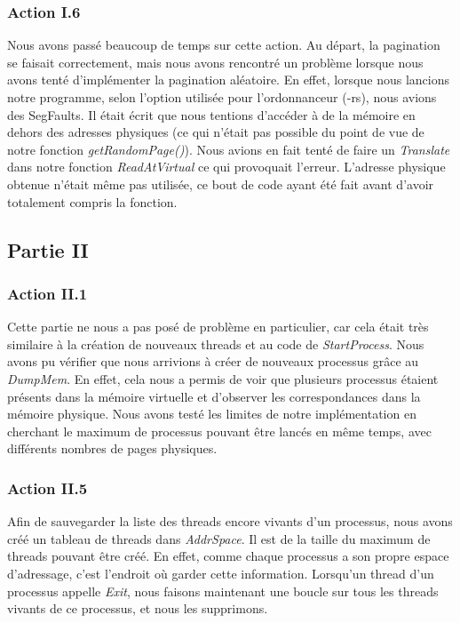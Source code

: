 \documentclass{article}
\begin{document}
\subsubsection{Action I.6}
Nous avons passé beaucoup de temps sur cette action. Au départ, la pagination se faisait 
correctement, mais nous avons rencontré un problème
 lorsque nous avons tenté d'implémenter la pagination aléatoire. En effet, lorsque nous lancions
 notre programme, selon l'option utilisée pour l'ordonnanceur (-rs), nous avions des SegFaults.
 Il était écrit que nous tentions d'accéder à de la mémoire en dehors des adresses physiques (ce qui
 n'était pas possible du point de vue de notre fonction \textit{getRandomPage()}). Nous avions en fait
 tenté de faire un \textit{Translate} dans notre fonction \textit{ReadAtVirtual} ce qui provoquait
 l'erreur. L'adresse physique obtenue n'était même pas utilisée, ce bout de code ayant
 été fait avant d'avoir totalement compris la fonction.

\subsection{Partie II}

\subsubsection{Action II.1}
Cette partie ne nous a pas posé de problème en particulier, car cela était très similaire à la création 
de nouveaux threads et au code de \textit{StartProcess}. Nous avons pu vérifier que nous
arrivions à créer de nouveaux processus grâce au \textit{DumpMem}. En effet, cela nous a permis
de voir que plusieurs processus étaient présents dans la mémoire virtuelle et d'observer les
correspondances dans la mémoire physique. Nous avons testé les limites de notre implémentation
en cherchant le maximum de processus pouvant être lancés en même temps, avec différents nombres
de pages physiques.


\subsubsection{Action II.5}
Afin de sauvegarder la liste des threads encore vivants d'un processus, nous avons créé un tableau de threads dans \textit{AddrSpace}.
Il est de la taille du maximum de threads pouvant être créé. En effet, comme chaque processus a son propre espace d'adressage, c'est l'endroit
où garder cette information. Lorsqu'un thread d'un processus appelle \textit{Exit}, nous faisons maintenant une boucle sur tous les threads vivants
de ce processus, et nous les supprimons.
\end{document}
